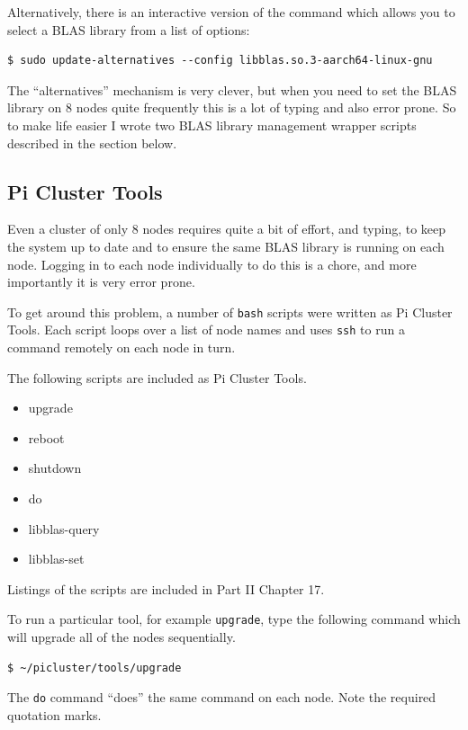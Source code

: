 \documentclass{report}
\begin{document}
Alternatively, there is an interactive version of the command which allows you to select a BLAS library from a list of options:

\lstset{style=type}
\begin{lstlisting}
$ sudo update-alternatives --config libblas.so.3-aarch64-linux-gnu
\end{lstlisting}

The ``alternatives'' mechanism is very clever, but when you need to set the BLAS library on 8 nodes quite frequently this is a lot of typing and also error prone. So to make life easier I wrote two BLAS library management wrapper scripts described in the section below. 


%
%
\subsection{Pi Cluster Tools}

Even a cluster of only 8 nodes requires quite a bit of effort, and typing, to keep the system up to date and to ensure the same BLAS library is running on each node. Logging in to each node individually to do this is a chore, and more importantly it is very error prone.

To get around this problem, a number of \verb|bash| scripts were written as Pi Cluster Tools. Each script loops over a list of node names and uses \verb|ssh| to run a command remotely on each node in turn.

The following scripts are included as Pi Cluster Tools.

\begin{itemize}
\item upgrade
\item reboot
\item shutdown
\item do
\item libblas-query
\item libblas-set
\end{itemize}

Listings of the scripts are included in Part II Chapter 17.

To run a particular tool, for example \verb|upgrade|, type the following command which will upgrade all of the nodes sequentially.

\lstset{style=type}
\begin{lstlisting}
$ ~/picluster/tools/upgrade
\end{lstlisting}

The \verb|do| command ``does'' the same command on each node. Note the required quotation marks.
\end{document}
